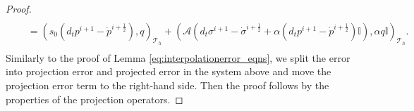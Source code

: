 \documentclass[10pt,letterpaper]{amsart}
\theoremstyle{plain} %
\theoremstyle{remark} %
\newcommand{\vect}[1]{\mathbf{#1}}
\newcommand{\divergence}{\mathrm{div}\,}
\newcommand{\grad}{\mathrm{grad}\,}
\newcommand{\Id}{\mathbb{I}} %
\newcommand{\Ael}{\mathcal{A}} %
\newcommand{\Thprod}[2]{( #1, #2 )_{\mathcal{T}_h}}
\newcommand{\pThprod}[2]{\langle #1, #2 \rangle_{\partial \mathcal{T}_{h}}}
\begin{document}
\begin{proof}
\begin{align*}
		\\
		&\quad = \Thprod{s_{0}(d_t{p}^{i+1}-\dot{p}^{i+\frac 12})}{q} + \Thprod{\Ael(d_t{\sigma}^{i+1}- \dot{\sigma}^{i+\frac 12}+\alpha (d_t{p}^{i+1} - \dot{p}^{i+\frac 12})\Id)}{\alpha q\Id} . 
		\\
	\end{align*}
%
Similarly to the proof of Lemma \ref{eq:interpolationerror_eqns},  we split the error into projection error and projected error in the system above and move the projection error term to the right-hand side. Then the proof follows by the properties of the projection operators.

\end{proof}
\end{document}
